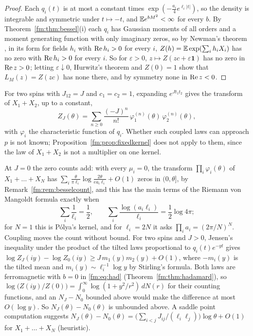 \begin{proof}
Each $q_i(t)$ is at most a constant times $\exp(-\frac{a_i}4e^{\ell_i|t|})$, so the density is integrable and symmetric under $t\mapsto-t$, and $\mathbb{E} e^{bM^2}<\infty$ for every $b$. By Theorem~\ref{fm:thm:bessel}(i) each $q_i$ has Gaussian moments of all orders and a moment generating function with only imaginary zeros, so by Newman's theorem \cite{Newman74,LiebSokal81}, in its form for fields $h_i$ with $\operatorname{Re} h_i>0$ for every $i$, $Z(h)=\mathbb{E}\exp(\sum_ih_iX_i)$ has no zero with $\operatorname{Re} h_i>0$ for every $i$. So for $\varepsilon>0$, $z\mapsto Z(zc+\varepsilon\mathbf 1)$ has no zero in $\operatorname{Re} z>0$; letting $\varepsilon\downarrow0$, Hurwitz's theorem and $Z(0)=1$ show that $L_M(z)=Z(zc)$ has none there, and by symmetry none in $\operatorname{Re} z<0$.
\end{proof}

For two spins with $J_{12}=J$ and $c_1=c_2=1$, expanding $e^{Jt_1t_2}$ gives the transform of $X_1+X_2$, up to a constant,
\[
Z_J(\theta)=\sum_{n\ge0}\frac{(-J)^n}{n!}\,\varphi_1^{(n)}(\theta)\,\varphi_2^{(n)}(\theta),
\]
with $\varphi_i$ the characteristic function of $q_i$. Whether such coupled laws can approach $p$ is not known; Proposition~\ref{fm:prop:fixedkernel} does not apply to them, since the law of $X_1+X_2$ is not a multiplier on one kernel.

At $J=0$ the zero counts add: with every $\mu_i=0$, the transform $\prod_i\varphi_i(\theta)$ of $X_1+\dots+X_N$ has $\sum_i\frac\theta{\pi\ell_i}\log\frac{2\theta}{ea_i\ell_i}+O(1)$ zeros in $(0,\theta]$, by Remark~\ref{fm:rem:besselcount}, and this has the main terms of the Riemann von Mangoldt formula exactly when
\[
\sum_i\frac1{\ell_i}=\frac12,\qquad\sum_i\frac{\log(a_i\ell_i)}{\ell_i}=\frac12\log4\pi ;
\]
for $N=1$ this is P\'olya's kernel, and for $\ell_i=2N$ it asks $\prod_ia_i=(2\pi/N)^N$. Coupling moves the count without bound. For two spins and $J>0$, Jensen's inequality under the product of the tilted laws proportional to $q_i(t)e^{-yt}$ gives $\log Z_J(iy)-\log Z_0(iy)\ge J\,m_1(y)m_2(y)+O(1)$, where $-m_i(y)$ is the tilted mean and $m_i(y)\sim\ell_i^{-1}\log y$ by Stirling's formula. Both laws are ferromagnetic with $b=0$ in \eqref{fm:eq:had} (Theorem~\ref{fm:thm:hadamard}), so $\log\big(Z(iy)/Z(0)\big)=\int_0^\infty\log(1+y^2/r^2)\,dN(r)$ for their counting functions, and an $N_J-N_0$ bounded above would make the difference at most $O(\log y)$. So $N_J(\theta)-N_0(\theta)$ is unbounded above. A saddle point computation suggests $N_J(\theta)-N_0(\theta)=\big(\sum_{i<j}J_{ij}/(\ell_i\ell_j)\big)\log\theta+O(1)$ for $X_1+\dots+X_N$ (heuristic).

